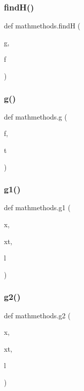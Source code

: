 \mbox{\label{namespacemathmethods_a81711f80750b9ec11d8bdea628ec2808}} 
\subsubsection{\texorpdfstring{find\+H()}{findH()}}
{\footnotesize\ttfamily def mathmethods.\+findH (\begin{DoxyParamCaption}\item[{}]{g,  }\item[{}]{f }\end{DoxyParamCaption})}

\mbox{\label{namespacemathmethods_ac31111223c9bdad18dca6586c9c91785}} 
\subsubsection{\texorpdfstring{g()}{g()}}
{\footnotesize\ttfamily def mathmethods.\+g (\begin{DoxyParamCaption}\item[{}]{f,  }\item[{}]{t }\end{DoxyParamCaption})}

\mbox{\label{namespacemathmethods_a2af85014ee6cf45e45eba4e131714110}} 
\subsubsection{\texorpdfstring{g1()}{g1()}}
{\footnotesize\ttfamily def mathmethods.\+g1 (\begin{DoxyParamCaption}\item[{}]{x,  }\item[{}]{xt,  }\item[{}]{l }\end{DoxyParamCaption})}

\mbox{\label{namespacemathmethods_a701fd8e4733e6f1c587540dc29d8729e}} 
\subsubsection{\texorpdfstring{g2()}{g2()}}
{\footnotesize\ttfamily def mathmethods.\+g2 (\begin{DoxyParamCaption}\item[{}]{x,  }\item[{}]{xt,  }\item[{}]{l }\end{DoxyParamCaption})}

